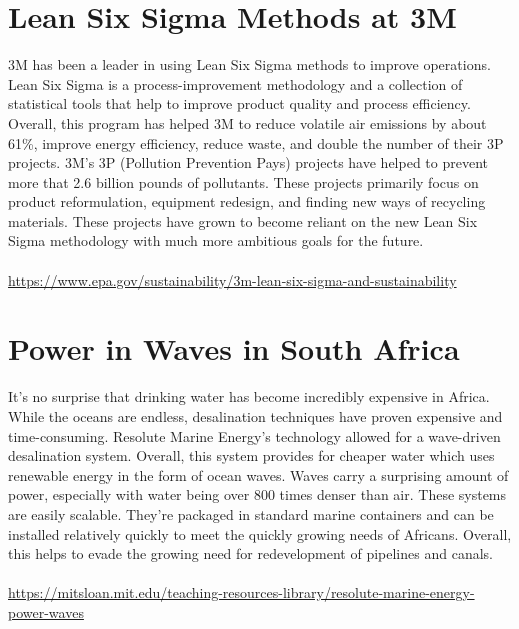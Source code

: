 \documentclass{article}
\begin{document}
\begin{spacing}{2.15}
    \section{Lean Six Sigma Methods at 3M}
    \indent 3M has been a leader in using Lean Six Sigma methods to improve operations. Lean Six Sigma is a process-improvement methodology and a collection of statistical tools that help to improve product quality and process efficiency. Overall, this program has helped 3M to reduce volatile air emissions by about 61\%, improve energy efficiency, reduce waste, and double the number of their 3P projects. 3M's 3P (Pollution Prevention Pays) projects have helped to prevent more that 2.6 billion pounds of pollutants. These projects primarily focus on product reformulation, equipment redesign, and finding new ways of recycling materials. These projects have grown to become reliant on the new Lean Six Sigma methodology with much more ambitious goals for the future.\\\\
    \url{https://www.epa.gov/sustainability/3m-lean-six-sigma-and-sustainability}
    \section{Power in Waves in South Africa}
    \indent It's no surprise that drinking water has become incredibly expensive in Africa. While the oceans are endless, desalination techniques have proven expensive and time-consuming. Resolute Marine Energy's technology allowed for a wave-driven desalination system. Overall, this system provides for cheaper water which uses renewable energy in the form of ocean waves. Waves carry a surprising amount of power, especially with water being over 800 times denser than air. These systems are easily scalable. They're packaged in standard marine containers and can be installed relatively quickly to meet the quickly growing needs of Africans. Overall, this helps to evade the growing need for redevelopment of pipelines and canals.\\\\
    \url{https://mitsloan.mit.edu/teaching-resources-library/resolute-marine-energy-power-waves}
    \newpage

\end{spacing}
\end{document}
